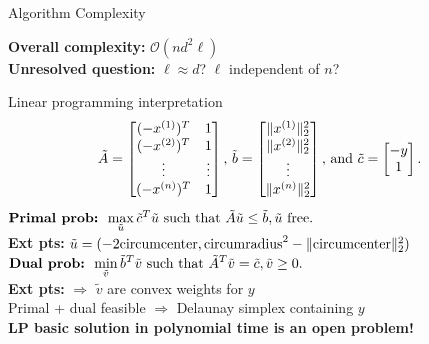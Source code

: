 \documentclass[aspectratio=169]{beamer}
\begin{document}
\begin{frame}{Algorithm Complexity}
\medskip
\pause
{\bf Overall complexity:} $\mathcal{O}(nd^2 \ell)$\\
\medskip
\pause
{\bf Unresolved question:} $\ell \approx d$? $\ell$ independent of $n$?
\end{frame}

\begin{frame}{Linear programming interpretation}
$$
{\tilde A} = \left[ \begin{matrix}
(-x^{(1)})^T & 1 \cr
(-x^{(2)})^T & 1 \cr
\vdots & \vdots \cr
(-x^{(n)})^T & 1 \cr
\end{matrix}\right]\text{, }
{\tilde b} = \left[ \begin{matrix}
\| x^{(1)} \|_2^2 \cr
\| x^{(2)} \|_2^2 \cr
\vdots \cr
\| x^{(n)} \|_2^2 \cr
\end{matrix}\right]\text{, and }
{\tilde c} = \left[ \begin{matrix}
-y \cr
1 \cr
\end{matrix}\right].
$$
\pause
$\displaystyle \hbox{\bf Primal prob: }
\max_{\tilde u} {\tilde c}^T {\tilde u}
\hbox{ such that }
{\tilde A}{\tilde u} \leq {\tilde b}, {\tilde u}\hbox{ free}.$\\
{\bf Ext pts:}
${\tilde u} = (-2\hbox{circumcenter}, \hbox{circumradius}^2 - \|\hbox{circumcenter}\|_2^2)$\\
\medskip
\pause
$\displaystyle \hbox{\bf Dual prob: }
\min_{\tilde v} {\tilde b}^T {\tilde v}
\hbox{ such that }
{\tilde A}^T{\tilde v} = {\tilde c}, {\tilde v}\geq 0.$\\
{\bf Ext pts:}
$\Rightarrow$ ${\tilde v}$ are convex weights for $y$\\
\medskip
\pause
Primal + dual feasible $\Rightarrow$ Delaunay simplex containing $y$\\
\medskip
\pause
{\bf LP basic solution in polynomial time is an open problem!}
\end{frame}
\end{document}
